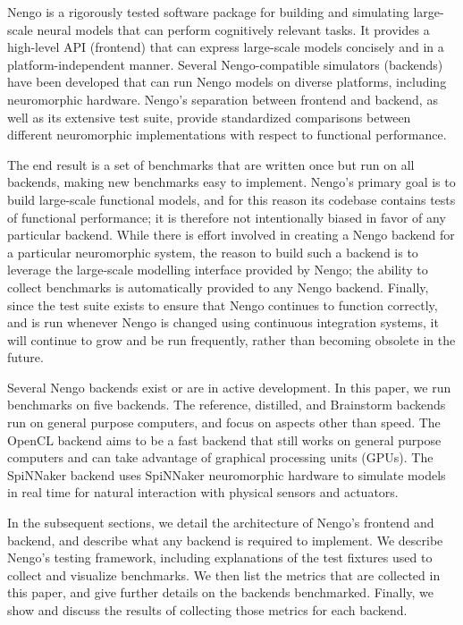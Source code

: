 \documentclass{frontiersSCNS}
\begin{document}
Nengo is a rigorously tested software package
for building and simulating
large-scale neural models
that can perform cognitively relevant tasks.
It provides a high-level API (frontend)
that can express large-scale models concisely
and in a platform-independent manner.
Several Nengo-compatible simulators (backends)
have been developed that can
run Nengo models on diverse platforms,
including neuromorphic hardware.
Nengo's separation between frontend and backend,
as well as its extensive test suite,
provide standardized comparisons
between different neuromorphic implementations
with respect to functional performance.

The end result is a set of benchmarks that
are written once but run on all backends,
making new benchmarks easy to implement.
Nengo's primary goal is to
build large-scale functional models,
and for this reason its codebase contains
tests of functional performance;
it is therefore not intentionally
biased in favor of any particular backend.
While there is effort involved in creating
a Nengo backend for a particular neuromorphic system,
the reason to build such a backend
is to leverage the large-scale modelling interface
provided by Nengo;
the ability to collect benchmarks
is automatically provided to any Nengo backend.
Finally, since the test suite exists
to ensure that Nengo continues to function
correctly, and is run whenever Nengo is changed using
continuous integration systems,
it will continue to grow and be run frequently,
rather than becoming obsolete in the future.

Several Nengo backends exist or are in active development.
In this paper, we run benchmarks
on five backends.
The reference, distilled, and Brainstorm backends
run on general purpose computers,
and focus on aspects other than speed.
The OpenCL backend aims to be a fast backend
that still works on general purpose computers
and can take advantage of
graphical processing units (GPUs).
The SpiNNaker backend uses
SpiNNaker neuromorphic hardware to
simulate models in real time
for natural interaction with
physical sensors and actuators.

In the subsequent sections,
we detail the architecture of Nengo's
frontend and backend,
and describe what any backend
is required to implement.
We describe Nengo's testing framework,
including explanations of the test fixtures
used to collect and visualize benchmarks.
We then list the metrics
that are collected in this paper,
and give further details on the backends benchmarked.
Finally, we show and discuss
the results of collecting those metrics
for each backend.
\end{document}
